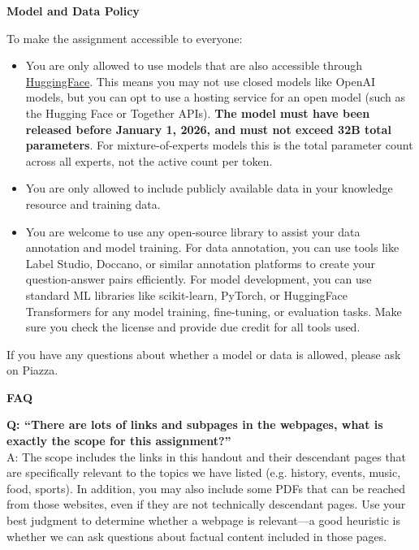 \documentclass[11pt]{article}
\newcommand{\problem}[1]{%
  \vspace{1em}
  \noindent\colorbox{headerblue}{\parbox{\dimexpr\textwidth-2\fboxsep}{%
    \vspace{2pt}\textbf{\large #1}\vspace{2pt}}}
  \vspace{0.6em}
}
\begin{document}
\problem{Model and Data Policy}

\noindent To make the assignment accessible to everyone:

\begin{itemize}[leftmargin=2em]
  \item You are only allowed to use models that are also accessible through
    \href{https://huggingface.co/models}{HuggingFace}. This means you may not use closed models like
    OpenAI models, but you can opt to use a hosting service for an open model (such as the Hugging
    Face or Together APIs). \textbf{The model must have been released before January 1, 2026, and must
    not exceed 32B total parameters}. For mixture-of-experts models this is the total parameter
    count across all experts, not the active count per token.
  \item You are only allowed to include publicly available data in your knowledge resource and
    training data.
  \item You are welcome to use any open-source library to assist your data annotation and model
    training. For data annotation, you can use tools like Label Studio, Doccano, or similar annotation
    platforms to create your question-answer pairs efficiently. For model development, you can use
    standard ML libraries like scikit-learn, PyTorch, or HuggingFace Transformers for any model
    training, fine-tuning, or evaluation tasks. Make sure you check the license and provide due credit
    for all tools used.
\end{itemize}

\noindent If you have any questions about whether a model or data is allowed, please ask on Piazza.

\problem{FAQ}

\noindent\textbf{Q: ``There are lots of links and subpages in the webpages, what is exactly the scope
for this assignment?''}\\
A: The scope includes the links in this handout and their descendant pages that are specifically
relevant to the topics we have listed (e.g. history, events, music, food, sports). In addition, you
may also include some PDFs that can be reached from those websites, even if they are not technically
descendant pages. Use your best judgment to determine whether a webpage is relevant---a good heuristic
is whether we can ask questions about factual content included in those pages.
\end{document}
